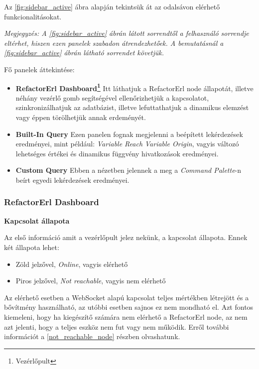 Az \ref{fig:sidebar_active} ábra alapján tekintsük át az odalsávon elérhető funkcionalitásokat. 

\textit{Megjegyzés: A \ref{fig:sidebar_active} ábrán látott sorrendtől a felhasználó sorrendje eltérhet, hiszen ezen panelek szabadon átrendezhetőek. A bemutatásnál a \ref{fig:sidebar_active} ábrán látható sorrendet követjük.}

Fő panelek áttekintése:

\begin{itemize}
    \item \textbf{RefactorErl Dashboard\footnote{Vezérlőpult}} Itt láthatjuk a RefactorErl node állapotát, illetve néhány vezérlő gomb segítségével ellenőrizhetjük a kapcsolatot, szinkronizálhatjuk az adatbázist, illetve lefuttathatjuk  a dinamikus elemzést vagy éppen törölhetjük annak erdeményét.
    \item \textbf{Built-In Query} Ezen panelen fognak megjelenni a beépített lekérdezések eredményei, mint például: \textit{Variable Reach} \textit{Variable Origin}, vagyis változó lehetséges értékei és dinamikus függvény hivatkozások eredményei.
    \item \textbf{Custom Query} Ebben a nézetben jelennek a meg a \textit{Command Palette}-n beírt egyedi lekérdezések eredményei.
\end{itemize}

\newpage

\subsubsection{RefactorErl Dashboard} \label{referlDashboard}

\noindent \textbf{Kapcsolat állapota}

Az első információ amit a vezérlőpult jelez nekünk, a kapcsolat állapota. Ennek két állapota lehet:

\begin{itemize}
    \item Zöld jelzővel, \textit{Online}, vagyis elérhető
    \item Piros jelzővel, \textit{Not reachable}, vagyis nem elérhető
\end{itemize}

Az elérhető esetben a WebSocket alapú kapcsolat teljes mértékben létrejött és a bővítmény használható, az utóbbi esetben sajnos ez nem mondható el. Azt fontos kiemeleni, hogy ha kiegészítő számára nem elérhető a RefactorErl node, az nem azt jelenti, hogy a teljes eszköz nem fut vagy nem működik. Erről további információt a \ref{not_reachable_node} részben olvashatunk.

